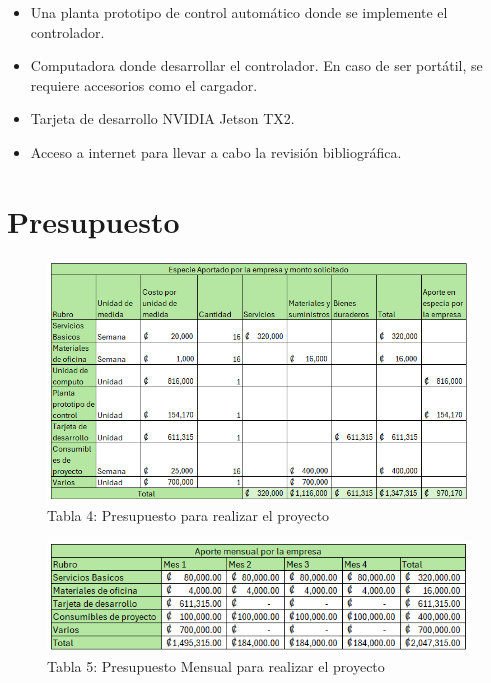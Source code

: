 \documentclass[12pt]{article}
\begin{document}
\begin{itemize}
  \item Una planta prototipo de control automático donde se implemente el controlador.
  \item Computadora donde desarrollar el controlador. En caso de ser portátil, se requiere accesorios como el cargador.
  \item Tarjeta de desarrollo NVIDIA Jetson TX2.
  \item Acceso a internet para llevar a cabo la revisión bibliográfica.
\end{itemize}

\newpage

\section{Presupuesto}

\begin{figure}[ht]
  \centering
  \includegraphics[scale=0.8]{tablas/ptot.png}
  \captionsetup{labelformat=empty}  %
  \caption{Tabla 4: Presupuesto para realizar el proyecto}
\end{figure}

\begin{figure}[ht]
  \centering
  \includegraphics[scale=0.8]{tablas/pmensual.png}
  \captionsetup{labelformat=empty}  %
  \caption{Tabla 5: Presupuesto Mensual para realizar el proyecto}
\end{figure}


\newpage



\end{document}
